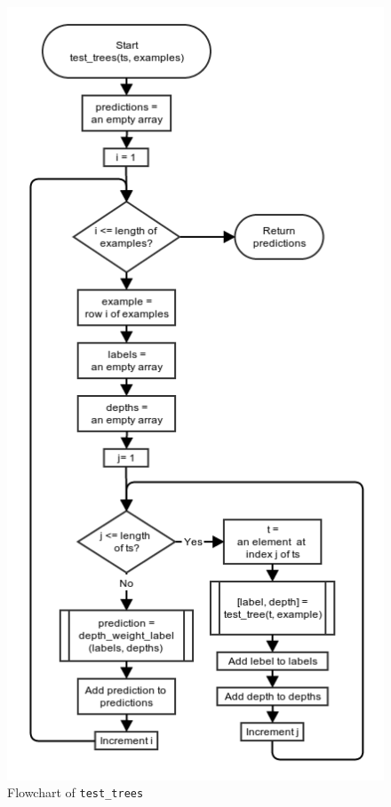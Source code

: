 \documentclass[10pt,a4paper]{article}
\begin{document}
\begin{figure}[!ht]
	\centering
	\includegraphics[scale=0.6]{images/flow_chart/test_trees.png}
	\caption{Flowchart of \tt{test\_trees}}
	\label{fig:test_trees}
\end{figure}
\end{document}

